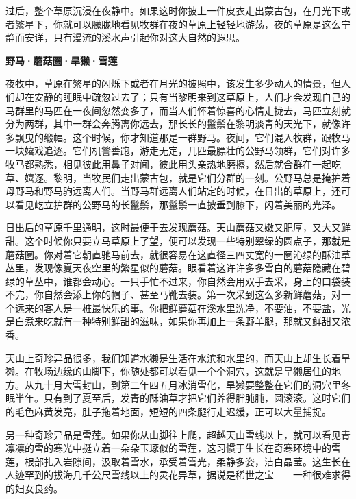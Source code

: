 \documentclass[12pt,UTF-8,openany]{ctexbook}
\begin{document}
\begin{normalsize}
    过后，整个草原沉浸在夜静中。如果这时你披上一件皮衣走出蒙古包，在月光下或者繁星下，你就可以朦胧地看见牧群在夜的草原上轻轻地游荡，夜的草原是这么宁静而安详，只有漫流的溪水声引起你对这大自然的遐思。
    
    \begin{center}
    
    \begin{large}\textbf{野马·蘑菇圈·旱獭·雪莲}\end{large}
    
    \end{center}
    
    夜牧中，草原在繁星的闪烁下或者在月光的披照中，该发生多少动人的情景，但人们却在安静的睡眠中疏忽过去了；只有当黎明来到这草原上，人们才会发现自己的马群里的马匹在一夜间忽然变多了，而当人们怀着惊喜的心情走拢去，马匹立刻就分为两群，其中一群会奔腾离你远去，那长长的鬣鬃在黎明淡青的天光下，就像许多飘曳的缎幅。这个时候，你才知道那是一群野马。夜间，它们混入牧群，跟牧马一块嬉戏追逐。它们机警善跑，游走无定，几匹最膘壮的公野马领群，它们对许多牧马都熟悉，相见彼此用鼻子对闻，彼此用头亲热地磨擦，然后就合群在一起吃草、嬉逐。黎明，当牧民们走出蒙古包，就是它们分群的一刻。公野马总是掩护着母野马和野马驹远离人们。当野马群远离人们站定的时候，在日出的草原上，还可以看见屹立护群的公野马的长鬣鬃，那鬣鬃一直披垂到膝下，闪着美丽的光泽。
    
    日出后的草原千里通明，这时最便于去发现蘑菇。天山蘑菇又嫩又肥厚，又大又鲜甜。这个时候你只要立马草原上了望，便可以发现一些特别翠绿的圆点子，那就是蘑菇圈。你对着它朝直驰马前去，就很容易在这直径三四丈宽的一圈沁绿的酥油草丛里，发现像夏天夜空里的繁星似的蘑菇。眼看着这许许多多雪白的蘑菇隐藏在碧绿的草丛中，谁都会动心。一只手忙不过来，你自然会用双手去采，身上的口袋装不完，你自然会添上你的帽子、甚至马靴去装。第一次采到这么多新鲜蘑菇，对一个远来的客人是一桩最快乐的事。你把鲜蘑菇在溪水里洗净，不要油，不要盐，光是白煮来吃就有一种特别鲜甜的滋味，如果你再加上一条野羊腿，那就又鲜甜又浓香。
    
    天山上奇珍异品很多，我们知道水獭是生活在水滨和水里的，而天山上却生长着旱獭。在牧场边缘的山脚下，你随处都可以看见一个个洞穴，这就是旱獭居住的地方。从九十月大雪封山，到第二年四五月冰消雪化，旱獭要整整在它们的洞穴里冬眠半年。只有到了夏至后，发青的酥油草才把它们养得胖肫肫，圆滚滚。这时它们的毛色麻黄发亮，肚子拖着地面，短短的四条腿行走迟缓，正可以大量捕捉。
    
    另一种奇珍异品是雪莲。如果你从山脚往上爬，超越天山雪线以上，就可以看见青凛凛的雪的寒光中挺立着一朵朵玉琢似的雪莲，这习惯于生长在奇寒环境中的雪莲，根部扎入岩隙间，汲取着雪水，承受着雪光，柔静多姿，洁白晶莹。这生长在人迹罕到的拔海几千公尺雪线以上的灵花异草，据说是稀世之宝——一种很难求得的妇女良药。
    

\end{normalsize}
\end{document}
